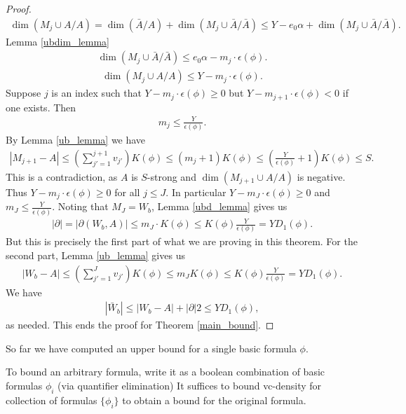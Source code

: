 \documentclass{amsart}
\newcommand{\BA}{\bar A}
\newcommand{\ppp}{\partial}
\newcommand{\paren}[1]{\left(#1\right)}
\newcommand{\abs}[1]{\left|#1\right|}
\begin{document}
\begin{proof}
  \begin{align*}
    \dim(M_j \cup A / A) = \dim(\BA / A) + \dim(M_j \cup \BA / \BA) \leq Y - e_0\alpha + \dim(M_j \cup \BA / \BA).
  \end{align*}
  Lemma \ref{ubdim_lemma} %
  \begin{align*}
    \dim(M_j \cup \BA / \BA) \leq e_0 \alpha - m_j \cdot \epsilon(\phi).
  \end{align*}
  \begin{align*}
    \dim(M_j \cup A / A) \leq Y - m_j \cdot \epsilon(\phi).
  \end{align*}
  Suppose $j$ is an index such that $Y - m_j \cdot \epsilon(\phi) \geq 0$ but $Y - m_{j+1} \cdot \epsilon(\phi) < 0$ if one exists.
  Then 
  \begin{align*}
    m_j \leq \frac{Y}{\epsilon(\phi)}.
  \end{align*}
  By Lemma \ref{ub_lemma} we have
  \begin{align*}
    \abs{M_{j+1} - A} \leq \paren{\sum_{j'=1}^{j+1} v_{j'}} K(\phi) \leq (m_j + 1) K(\phi) \leq \paren{\frac{Y}{\epsilon(\phi)} + 1} K(\phi) \leq S.
  \end{align*}
  This is a contradiction, as $A$ is $S$-strong and $\dim(M_{j+1} \cup A / A)$ is negative.
  Thus $Y - m_j \cdot \epsilon(\phi) \geq 0$ for all $j \leq J$.
  In particular $Y - m_J \cdot \epsilon(\phi) \geq 0$ and $m_J \leq \frac{Y}{\epsilon(\phi)}$.
  Noting that $M_J = W_b$, Lemma \ref{ubd_lemma} gives us 
  \begin{align*}
      |\ppp| = |\partial(W_b, A)| \leq m_J \cdot K(\phi) \leq K(\phi) \frac{Y}{\epsilon(\phi)} = Y D_1(\phi).
  \end{align*}
  But this is precisely the first part of what we are proving in this theorem.
  For the second part, Lemma \ref{ub_lemma} gives us
  \begin{align*}
    \abs{W_b - A} \leq \paren{\sum_{j'=1}^J v_{j'}} K(\phi) \leq m_J K(\phi)  \leq K(\phi) \frac{Y}{\epsilon(\phi)} = Y D_1(\phi).
  \end{align*}
  We have
  \begin{align*}
      |\bar W_b| \leq \abs{W_b - A} + \abs{\ppp} 2\leq Y D_1(\phi),
  \end{align*}
  as needed.
  This ends the proof for Theorem \ref{main_bound}.
\end{proof}

So far we have computed an upper bound for a single basic formula $\phi$.

To bound an arbitrary formula, write it as a boolean combination of basic formulas $\phi_i$ (via quantifier elimination)
It suffices to bound vc-density for collection of formulas $\{\phi_i\}$ to obtain a bound for the original formula.
\end{document}
